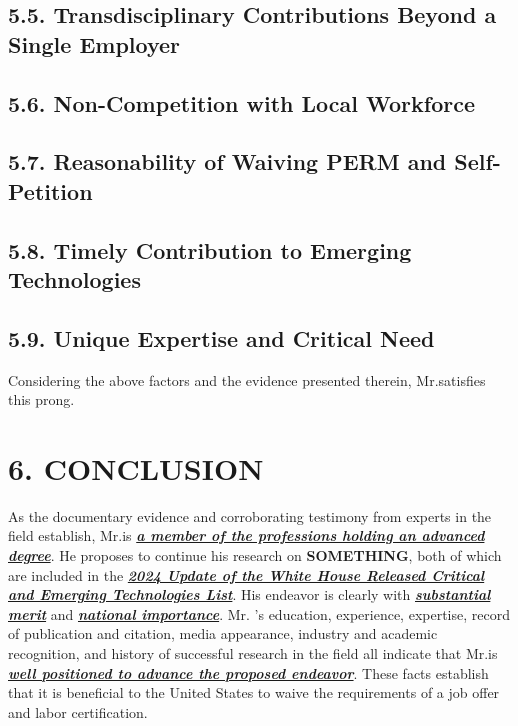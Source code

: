 \subsection{\texorpdfstring{5.5. Transdisciplinary Contributions Beyond a Single Employer}{5.5. Transdisciplinary Contributions Beyond a Single Employer}}


\subsection{\texorpdfstring{5.6. Non-Competition with Local Workforce}{5.6. Non-Competition with Local Workforce}}

\subsection{\texorpdfstring{5.7. Reasonability of Waiving PERM and Self-Petition}{5.7. Reasonability of Waiving PERM and Self-Petition}}

\subsection{\texorpdfstring{5.8. Timely Contribution to Emerging Technologies}{5.8. Timely Contribution to Emerging Technologies}}

\subsection{\texorpdfstring{5.9. Unique Expertise and Critical Need}{5.9. Unique Expertise and Critical Need}}

Considering the above factors and the evidence presented therein, Mr.\myname satisfies this prong.

\section{\texorpdfstring{6. CONCLUSION}{6. CONCLUSION}}\label{conclusion}

As the documentary evidence and corroborating testimony from experts in the field establish, Mr.\myname is \emph{\textbf{\ul{a member of the professions holding an advanced degree}}}. He proposes to continue his research on \textbf{SOMETHING}, both of which are included in the \emph{\textbf{\ul{2024 Update of the White House Released Critical and Emerging Technologies List}}}. His endeavor is clearly with \emph{\textbf{\ul{substantial merit}}} and \emph{\textbf{\ul{national importance}}}. Mr. \myname's education, experience, expertise, record of publication and citation, media appearance, industry and academic recognition, and history of successful research in the field all indicate that Mr.\myname is \emph{\textbf{\ul{well positioned to advance the proposed endeavor}}}. These facts establish that it is beneficial to the United States to waive the requirements of a job offer and labor certification.